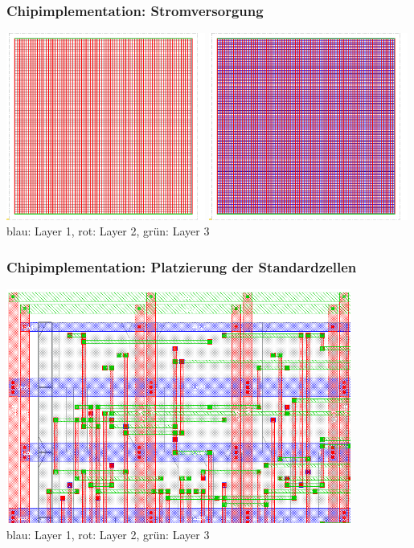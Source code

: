 \begin{frame}\frametitle{Chipimplementation: Stromversorgung}
\begin{center}
        \includegraphics[width=0.49\textwidth]{img/FP_3.png}
        \hfill
        \includegraphics[width=0.49\textwidth]{img/FP_4.png}
        blau: Layer 1,  rot:  Layer 2,  grün: Layer 3
\end{center}
\end{frame}

\begin{frame}\frametitle{Chipimplementation: Platzierung der Standardzellen}
\begin{center}
 \includegraphics[width=0.85\textwidth]{img/Bilder/Screen1_BlockCell_crop_white.png}\\
 blau: Layer 1,  rot:  Layer 2,  grün: Layer 3
\end{center}
\end{frame}

